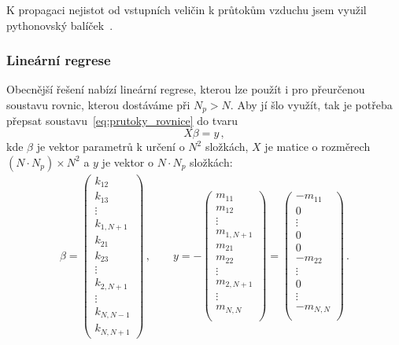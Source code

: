 K propagaci nejistot od vstupních veličin k průtokům vzduchu jsem využil pythonovský balíček~\cite{uncertainties}.
\subsubsection{Lineární regrese}
Obecnější řešení nabízí lineární regrese, kterou lze použít i pro přeurčenou soustavu rovnic, kterou dostáváme při $N_p>N$. Aby jí šlo využít, tak je potřeba přepsat soustavu~\eqref{eq:prutoky_rovnice} do tvaru 
\begin{equation}
    X\beta=y\,,
    \label{eq:prutoky_regrese}
\end{equation}
kde $\beta$ je vektor parametrů k určení o $N^2$ složkách, $X$ je matice o rozměrech $(N\cdot N_p)\times N^2$ a $y$ je vektor o $N\cdot N_p$ složkách:
\begin{align}
    \beta=
    \begin{pmatrix}
        k_{12}\\
        k_{13}\\
        \vdots\\
        k_{1,N+1}\\
        k_{21}\\
        k_{23}\\
        \vdots\\
        k_{2,N+1}\\
        \vdots\\
        k_{N,N-1}\\
        k_{N,N+1}
    \end{pmatrix}\,,\qquad y=
    -\begin{pmatrix}
        m_{11}\\
        m_{12}\\
        \vdots\\
        m_{1,N+1}\\
        m_{21}\\
        m_{22}\\
        \vdots\\
        m_{2,N+1}\\
        \vdots\\
        m_{N,N}\\
    \end{pmatrix}=
    \begin{pmatrix}
        -m_{11}\\
        0\\
        \vdots\\
        0\\
        0\\
        -m_{22}\\
        \vdots\\
        0\\
        \vdots\\
        -m_{N,N}\\
    \end{pmatrix}
    \,.
\end{align}
